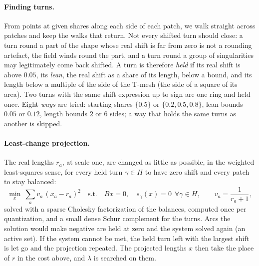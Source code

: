 \documentclass[11pt,a4paper]{article}
\newcommand{\shift}{s}
\begin{document}
\paragraph{Finding turns.}
From points at given shares along each side of each patch, we walk straight
across patches and keep the walks that return. Not every shifted turn should
close: a turn round a part of the shape whose real shift is far from zero is
not a rounding artefact, the field winds round the part, and a turn round a
group of singularities may legitimately come back shifted. A turn is
therefore \emph{held} if its real shift is above $0.05$, its \emph{lean}, the
real shift as a share of its length, below a bound, and its length below a
multiple of the side of the T-mesh (the side of a square of its area). Two
turns with the same shift expression up to sign are one ring and held once.
Eight \emph{ways} are tried: starting shares $\{0.5\}$ or $\{0.2, 0.5,
0.8\}$, lean bounds $0.05$ or $0.12$, length bounds $2$ or $6$ sides; a way
that holds the same turns as another is skipped.

\paragraph{Least-change projection.}
The real lengths $r_a$, at scale one, are changed as little as possible, in
the weighted least-squares sense, for every held turn $\gamma \in H$ to have
zero shift and every patch to stay balanced:
\[
  \min_{x}\ \sum_a v_a\,(x_a - r_a)^2
  \quad\text{s.t.}\quad B x = 0,\quad \shift_\gamma(x) = 0\ \ \forall\gamma\in H,
  \qquad v_a = \frac{1}{r_a + 1},
\]
solved with a sparse Cholesky factorization of the balances, computed once
per quantization, and a small dense Schur complement for the turns. Arcs the
solution would make negative are held at zero and the system solved again
(an active set). If the system cannot be met, the held turn left with the
largest shift is let go and the projection repeated. The projected lengths
$x$ then take the place of $r$ in the cost above, and $\lambda$ is searched
on them.
\end{document}
